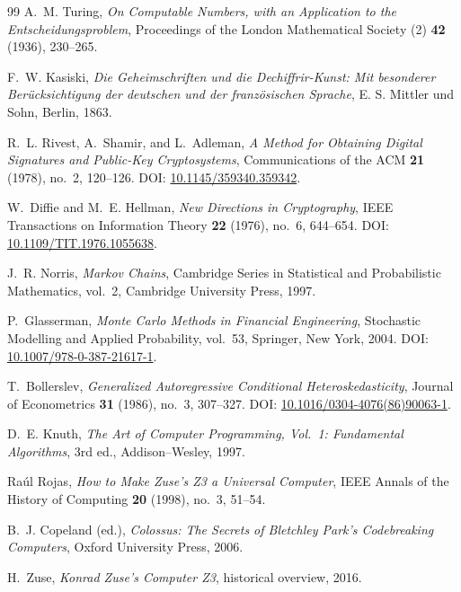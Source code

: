 \begin{thebibliography}{99}
A.~M. Turing,
\emph{On Computable Numbers, with an Application to the Entscheidungsproblem},
Proceedings of the London Mathematical Society (2) \textbf{42} (1936), 230--265.

F.~W. Kasiski,
\emph{Die Geheimschriften und die Dechiffrir-Kunst: Mit besonderer Ber\"ucksichtigung der deutschen und der franz\"osischen Sprache},
E. S. Mittler und Sohn, Berlin, 1863.

R.~L. Rivest, A.~Shamir, and L.~Adleman,
\emph{A Method for Obtaining Digital Signatures and Public-Key Cryptosystems},
Communications of the ACM \textbf{21} (1978), no.~2, 120--126.
\newblock DOI: \href{https://doi.org/10.1145/359340.359342}{10.1145/359340.359342}.

W.~Diffie and M.~E. Hellman,
\emph{New Directions in Cryptography},
IEEE Transactions on Information Theory \textbf{22} (1976), no.~6, 644--654.
\newblock DOI: \href{https://doi.org/10.1109/TIT.1976.1055638}{10.1109/TIT.1976.1055638}.

J.~R. Norris,
\emph{Markov Chains},
Cambridge Series in Statistical and Probabilistic Mathematics, vol.~2,
Cambridge University Press, 1997.

P.~Glasserman,
\emph{Monte Carlo Methods in Financial Engineering},
Stochastic Modelling and Applied Probability, vol.~53,
Springer, New York, 2004.
\newblock DOI: \href{https://doi.org/10.1007/978-0-387-21617-1}{10.1007/978-0-387-21617-1}.

T.~Bollerslev,
\emph{Generalized Autoregressive Conditional Heteroskedasticity},
Journal of Econometrics \textbf{31} (1986), no.~3, 307--327.
\newblock DOI: \href{https://doi.org/10.1016/0304-4076(86)90063-1}{10.1016/0304-4076(86)90063-1}.

D.~E. Knuth,
\emph{The Art of Computer Programming, Vol.~1: Fundamental Algorithms},
3rd ed., Addison--Wesley, 1997.

Ra\'ul Rojas,
\emph{How to Make Zuse's Z3 a Universal Computer},
IEEE Annals of the History of Computing \textbf{20} (1998), no.~3, 51--54.

B.~J. Copeland (ed.),
\emph{Colossus: The Secrets of Bletchley Park's Codebreaking Computers},
Oxford University Press, 2006.

H.~Zuse,
\emph{Konrad Zuse's Computer Z3},
historical overview, 2016.


\end{thebibliography}
